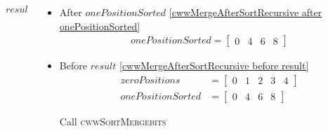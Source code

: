 \begin{frame}[containsverbatim]{\cwwalgortihmexampleframe}
\begin{columns}[c]
\begin{column}{0.45\textwidth}
{\begin{minipage}[c]{\textwidth}
\begin{algorithm}[H]
\begin{algorithmic}[1]
                                            \State \Return $result$
                                        \EndFunction
                                    \end{algorithmic}
                                \end{algorithm}
                            \endgroup
                        \end{minipage}
                    }
                \end{column}

                \begin{column}{0.55\textwidth}
                    \begin{itemize}
                        \item After $onePositionSorted$ \cref{cwwMergeAfterSortRecursive after onePositionSorted}
                        \begin{align*}
                            onePositionSorted = \begin{bmatrix}0 & 4 & 6 & 8\end{bmatrix}
                        \end{align*}

                        \item Before $result$ \cref{cwwMergeAfterSortRecursive before result}
                        \begin{align*}
                            zeroPositions & = \begin{bmatrix}0 & 1 & 2 & 3 & 4\end{bmatrix} \\
                            onePositionSorted & = \begin{bmatrix}0 & 4 & 6 & 8\end{bmatrix}
                        \end{align*}

                        Call \textsc{cwwSortMergebits}
                    \end{itemize}
                \end{column}
            \end{columns}
        \end{frame}

